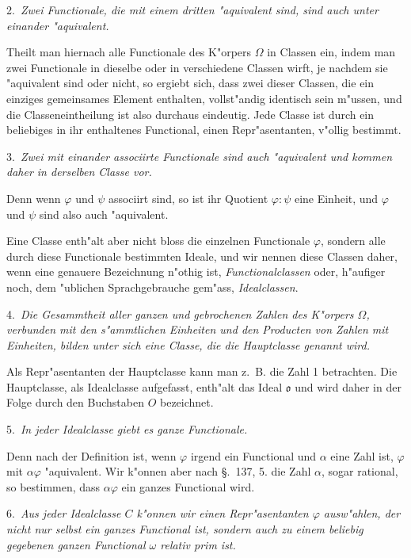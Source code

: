 \documentclass[12pt,a4paper]{article}
\theoremstyle{definition}
\begin{document}
2.~\emph{Zwei Functionale, die mit einem dritten "aquivalent sind, sind auch unter einander "aquivalent.}

Theilt man hiernach alle Functionale des K"orpers $\Omega$ in Classen ein, indem man zwei Functionale in dieselbe oder in verschiedene Classen wirft, je nachdem sie "aquivalent sind oder nicht, so ergiebt sich, dass zwei dieser Classen, die ein einziges gemeinsames Element enthalten, vollst"andig identisch sein m"ussen, und die Classeneintheilung ist also durchaus eindeutig. Jede Classe ist durch ein beliebiges in ihr enthaltenes Functional, einen Repr"asentanten, v"ollig bestimmt.

3.~\emph{Zwei mit einander associirte Functionale sind auch "aquivalent und kommen daher in derselben Classe vor.}

Denn wenn $\varphi$ und $\psi$ associirt sind, so ist ihr Quotient $\varphi : \psi$ eine Einheit, und $\varphi$ und $\psi$ sind also auch "aquivalent.

Eine Classe enth"alt aber nicht bloss die einzelnen Functionale $\varphi$, sondern alle durch diese Functionale bestimmten Ideale, und wir nennen diese Classen daher, wenn eine genauere Bezeichnung n"othig ist, \emph{Functionalclassen} oder, h"aufiger noch, dem "ublichen Sprachgebrauche gem"ass, \emph{Idealclassen}.

4.~\emph{Die Gesammtheit aller ganzen und gebrochenen Zahlen des K"orpers $\Omega$, verbunden mit den s"ammtlichen Einheiten und den Producten von Zahlen mit Einheiten, bilden unter sich eine Classe, die die Hauptclasse genannt wird.}

Als Repr"asentanten der Hauptclasse kann man z.~B. die Zahl 1 betrachten. Die Hauptclasse, als Idealclasse aufgefasst, enth"alt das Ideal $\mathfrak{o}$ und wird daher in der Folge durch den Buchstaben $O$ bezeichnet.

5.~\emph{In jeder Idealclasse giebt es ganze Functionale.}

Denn nach der Definition ist, wenn $\varphi$ irgend ein Functional und $\alpha$ eine Zahl ist, $\varphi$ mit $\alpha\varphi$ "aquivalent. Wir k"onnen aber nach \S.~137, 5. die Zahl $\alpha$, sogar rational, so bestimmen, dass $\alpha\varphi$ ein ganzes Functional wird.

6.~\emph{Aus jeder Idealclasse $C$ k"onnen wir einen Repr"asentanten $\varphi$ ausw"ahlen, der nicht nur selbst ein ganzes Functional ist, sondern auch zu einem beliebig gegebenen ganzen Functional $\omega$ relativ prim ist.}
\end{document}
